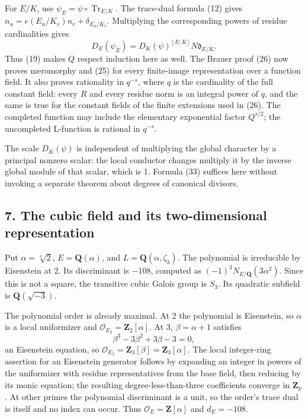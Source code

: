 \documentclass[11pt,a4paper]{article}
\begin{document}
For \(E/K\), use \(\psi_E=\psi\circ\operatorname{Tr}_{E/K}\). The
trace-dual formula (12) gives \(n_u=e(E_u/K_v)n_v+\delta_{E_u/K_v}\).
Multiplying the corresponding powers of residue cardinalities gives \[
D_E(\psi_E)=D_K(\psi)^{[E:K]}N\mathfrak d_{E/K}.
\tag{35}
\] Thus (19) makes \(Q\) respect induction here as well. The Brauer
proof (26) now proves meromorphy and (25) for every finite-image
representation over a function field. It also proves rationality in
\(q^{-s}\), where \(q\) is the cardinality of the full constant field:
every \(R\) and every residue norm is an integral power of \(q\), and
the same is true for the constant fields of the finite extensions used
in (26). The completed function may include the elementary exponential
factor \(Q^{s/2}\); the uncompleted L-function is rational in
\(q^{-s}\).

The scale \(D_K(\psi)\) is independent of multiplying the global
character by a principal nonzero scalar: the local conductor changes
multiply it by the inverse global module of that scalar, which is 1.
Formula (33) suffices here without invoking a separate theorem about
degrees of canonical divisors.

\subsection{7. The cubic field and its two-dimensional
representation}\label{the-cubic-field-and-its-two-dimensional-representation}

Put \(\alpha=\sqrt[3]2\), \(E=\mathbf Q(\alpha)\), and
\(L=\mathbf Q(\alpha,\zeta_3)\). The polynomial is irreducible by
Eisenstein at 2. Its discriminant is \(-108\), computed as
\((-1)^3N_{E/\mathbf Q}(3\alpha^2)\). Since this is not a square, the
transitive cubic Galois group is \(S_3\). Its quadratic subfield is
\(\mathbf Q(\sqrt{-3})\).

The polynomial order is already maximal. At 2 the polynomial is
Eisenstein, so \(\alpha\) is a local uniformizer and
\(\mathcal O_{E_2}=\mathbf Z_2[\alpha]\). At 3, \(\beta=\alpha+1\)
satisfies \[
\beta^3-3\beta^2+3\beta-3=0,
\tag{36}
\] an Eisenstein equation, so
\(\mathcal O_{E_3}=\mathbf Z_3[\beta]=\mathbf Z_3[\alpha]\). The local
integer-ring assertion for an Eisenstein generator follows by expanding
an integer in powers of the uniformizer with residue representatives
from the base field, then reducing by its monic equation; the resulting
degree-less-than-three coefficients converge in \(\mathbf Z_p\). At
other primes the polynomial discriminant is a unit, so the order's trace
dual is itself and no index can occur. Thus
\(\mathcal O_E=\mathbf Z[\alpha]\) and \(d_E=-108\).
\end{document}
